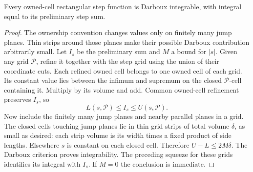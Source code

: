 \begin{proposition}
\label{prop:step-compatibility}
Every owned-cell rectangular step function is Darboux integrable, with
integral equal to its preliminary step sum.
\end{proposition}
\begin{proof}
The ownership convention changes values only on finitely
many jump planes. Thin strips around those planes make their possible
Darboux contribution arbitrarily small.
Let $I_s$ be the preliminary sum and $M$ a bound for $|s|$. Given any
grid $\mathcal P$, refine it together with the step grid using the union
of their coordinate cuts. Each refined owned cell belongs to one owned
cell of each grid. Its constant value lies between the infimum and
supremum on the closed $\mathcal P$-cell containing it. Multiply by its
volume and add. Common owned-cell refinement preserves $I_s$, so
\[
L(s,\mathcal P)\leq I_s\leq U(s,\mathcal P).
\]
Now include the finitely many jump planes and nearby parallel planes in
a grid. The closed cells touching jump planes lie in thin grid strips of
total volume $\delta$, as small as desired: each strip volume is its
width times a fixed product of side lengths. Elsewhere $s$ is constant
on each closed cell. Therefore $U-L\leq2M\delta$. The Darboux criterion
proves integrability. The preceding squeeze for these grids identifies
its integral with $I_s$. If $M=0$ the conclusion is immediate.
\end{proof}


